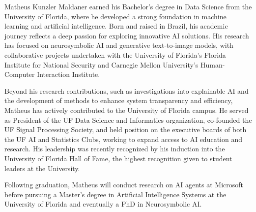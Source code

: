 


Matheus Kunzler Maldaner earned his Bachelor’s degree in Data Science from the University of Florida, where he developed a strong foundation in machine learning and artificial intelligence. Born and raised in Brazil, his academic journey reflects a deep passion for exploring innovative AI solutions. His research has focused on neurosymbolic AI and generative text-to-image models, with collaborative projects undertaken with the University of Florida's Florida Institute for National Security and Carnegie Mellon University’s Human-Computer Interaction Institute.

Beyond his research contributions, such as investigations into explainable AI and the development of methods to enhance system transparency and efficiency, Matheus has actively contributed to the University of Florida campus. He served as President of the UF Data Science and Informatics organization, co-founded the UF Signal Processing Society, and held position on the executive boards of both the UF AI and Statistics Clubs, working to expand access to AI education and research. His leadership was recently recognized by his induction into the University of Florida Hall of Fame, the highest recognition given to student leaders at the University.

Following graduation, Matheus will conduct research on AI agents at Microsoft before pursuing a Master's degree in Artificial Intelligence Systems at the University of Florida and eventually a PhD in Neurosymbolic AI. 
